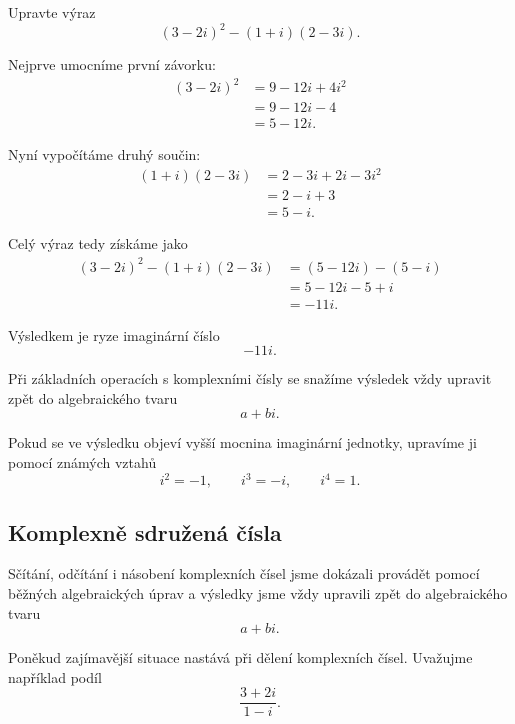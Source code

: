 \documentclass[12pt,a4paper]{article}
\begin{document}
\begin{examplebox}
    Upravte výraz
    \[
        (3-2i)^2-(1+i)(2-3i).
    \]

    Nejprve umocníme první závorku:
    \begin{align*}
        (3-2i)^2    &= 9-12i+4i^2 \\
                    &= 9-12i-4 \\
                    &= 5-12i.
    \end{align*}

    Nyní vypočítáme druhý součin:
    \begin{align*}
        (1+i)(2-3i) &= 2-3i+2i-3i^2 \\
                    &= 2-i+3 \\
                    &= 5-i.
    \end{align*}

    Celý výraz tedy získáme jako
    \begin{align*}
        (3-2i)^2-(1+i)(2-3i)    &= (5-12i)-(5-i) \\
                                &= 5-12i-5+i \\
                                &= -11i.
    \end{align*}

    Výsledkem je ryze imaginární číslo
    \[
        -11i.
    \]
\end{examplebox}



\begin{notebox}
    Při základních operacích s komplexními čísly se snažíme výsledek vždy upravit
    zpět do algebraického tvaru
    \[
        a+bi.
    \]

    Pokud se ve výsledku objeví vyšší mocnina imaginární jednotky, 
    upravíme ji pomocí známých vztahů
    \[
        i^2=-1,
        \qquad
        i^3=-i,
        \qquad
        i^4=1.
    \]
\end{notebox}

\subsection{Komplexně sdružená čísla}
Sčítání, odčítání i násobení komplexních čísel jsme dokázali provádět pomocí
běžných algebraických úprav a výsledky jsme vždy upravili zpět do algebraického tvaru
\[
    a+bi.
\]

Poněkud zajímavější situace nastává při dělení komplexních čísel. 
Uvažujme například podíl
\[
    \frac{3+2i}{1-i}.
\]
\end{document}
